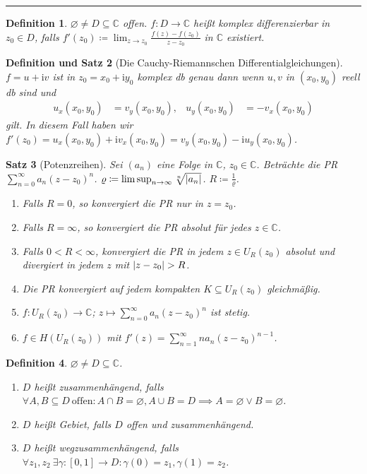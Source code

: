 \documentclass[a4paper]{article}
\newcounter{Sec}
\theoremstyle{marginbreak}
\newtheorem{definition}{Definition}[Sec]
\newtheorem{satz}[definition]{Satz}
\newtheorem{defsatz}[definition]{Definition und Satz}
\newcommand{\sep}{%
	\rule{\textwidth}{0.3pt}%
	\stepcounter{Sec}%
	}
\newcommand{\C}{\mathbb{C}}
\renewcommand{\i}{\mathrm{i}}
\begin{document}
	\sep
	\begin{definition}
		$\varnothing\neq D\subseteq\C$ offen. $f\colon D\to\C$ heißt komplex differenzierbar
		in $z_0\in D$, falls $f'(z_0)\coloneqq\lim_{z\to z_0}\frac{f(z)-f(z_0)}{z-z_0}$ in $\C$
		existiert.
	\end{definition}
	\begin{defsatz}[Die Cauchy-Riemannschen Differentialgleichungen]
		$f=u+\i v$ ist in $z_0=x_0+\i y_0$ komplex db genau dann wenn $u, v$ in $(x_0, y_0)$
		reell db sind und
		\begin{align*}
			u_x(x_0, y_0) &= v_y(x_0, y_0), & u_y(x_0, y_0) &= -v_x(x_0, y_0)
		\end{align*}
		gilt. In diesem Fall haben wir $f'(z_0) = u_x(x_0, y_0) + \i v_x(x_0, y_0) = v_y(x_0, y_0) - \i u_y(x_0, y_0)$.
	\end{defsatz}
	\begin{satz}[Potenzreihen]
		Sei $(a_n)$ eine Folge in $\C$, $z_0\in\C$. Beträchte die PR $\sum_{n=0}^\infty a_n(z-z_0)^n$.
		$\varrho\coloneqq\limsup_{n\to\infty}\sqrt[n]{\abs{a_n}}$. $R\coloneqq\frac{1}{\varrho}$.
		\begin{enumerate}[label=(\alph*)]
			\item Falls $R=0$, so konvergiert die PR nur in $z=z_0$.
			\item Falls $R=\infty$, so konvergiert die PR absolut für jedes $z\in\C$.
			\item Falls $0<R<\infty$, konvergiert die PR in jedem $z\in U_R(z_0)$ absolut
			und divergiert in jedem $z$ mit $\abs{z-z_0}>R$.
			\item Die PR konvergiert auf jedem kompakten $K\subseteq U_R(z_0)$ gleichmäßig.
			\item $f\colon U_R(z_0)\to\C$; $z\mapsto \sum_{n=0}^\infty a_n(z-z_0)^n$ ist stetig.
			\item $f\in H(U_R(z_0))$ mit $f'(z) = \sum_{n=1}^\infty na_n(z-z_0)^{n-1}$.
		\end{enumerate}
	\end{satz}
	\begin{definition}
		$\varnothing\neq D\subseteq\C$.
		\begin{enumerate}[label=(\alph*)]
			\item $D$ heißt zusammenhängend, falls $\forall A, B\subseteq D~\text{offen}:
				A\cap B=\varnothing, A\cup B=D\implies A=\varnothing\vee B=\varnothing$.
			\item $D$ heißt Gebiet, falls $D$ offen und zusammenhängend.
			\item $D$ heißt wegzusammenhängend, falls $\forall z_1, z_2~\exists \gamma\colon [0, 1]\to D: \gamma(0)=z_1, \gamma(1)=z_2$.
		\end{enumerate}
	\end{definition}
\end{document}
